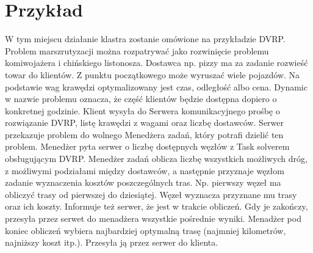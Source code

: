 \documentclass[12pt,a4paper,titlepage]{report}
\begin{document}
		\chapter{Przykład}
		W tym miejscu działanie klastra zostanie omówione na przykładzie DVRP. Problem marszrutyzacji można rozpatrywać jako rozwinięcie problemu komiwojażera i chińskiego listonosza. Dostawca np. pizzy ma za zadanie rozwieść towar do klientów. Z punktu początkowego może wyruszać wiele pojazdów. Na podstawie wag krawędzi optymalizowany jest czas, odległość albo cena. Dynamic w nazwie problemu oznacza, że część klientów będzie dostępna dopiero o konkretnej godzinie.
		Klient wysyła do Serwera komunikacyjnego prośbę o rozwiązanie DVRP, listę krawędzi z wagami oraz liczbę dostawców. Serwer przekazuje problem do wolnego Menedżera zadań, który potrafi dzielić ten problem. Menedżer pyta serwer o liczbę dostępnych węzłów z Task solverem obsługującym DVRP.
		Menedżer zadań oblicza liczbę wszystkich możliwych dróg, z możliwymi podziałami między dostawców, a następnie przyznaje węzłom zadanie wyznaczenia kosztów poszczególnych tras. Np. pierwszy węzeł ma obliczyć trasy od pierwszej do dziesiątej.
		Węzeł wyznacza przyznane mu trasy oraz ich koszty. Informuje też serwer, że jest w trakcie obliczeń. Gdy je zakończy, przesyła przez serwet do menadżera wszystkie pośrednie wyniki. Menadżer pod koniec obliczeń wybiera najbardziej optymalną trasę (najmniej kilometrów, najniższy koszt  itp.). Przesyła ją przez serwer do klienta.
	
	
\end{document}
